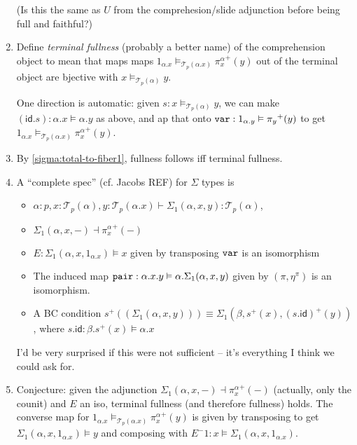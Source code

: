 \documentclass[10pt]{article}
\theoremstyle{definition}
\newcommand{\id}{\mathsf{id}}
\newcommand\TrPlus[2]{\ensuremath{{#1}^+(#2)}}
\newcommand\El[2]{\mathcal{T}_{#1}(#2)}
\begin{document}
\begin{enumerate}
  (Is this the same as $U$ from the comprehesion/slide adjunction before
  being full and faithful?)

\item \label{sigma:full-interesting} Define \emph{terminal fullness}
  (probably a better name) of the comprehension object to mean that maps
  maps $1_{\alpha.x} \vDash_{\El{p}{\alpha.x}} \TrPlus{\pi^\alpha_x}{y}$
  out of the terminal object are bjective with $x
  \vDash_{\El{p}{\alpha}} y$.

  One direction is automatic: given $s : x \vDash_{\El{p}{\alpha}} y$,
  we can make $(\id.s) : \alpha.x \vDash \alpha.y$ as above, and ap that
  onto $\mtt{var} : 1_{\alpha.y} \vDash \TrPlus{\pi_y}{y}$ to get
  $1_{\alpha.x} \vDash_{\El{p}{\alpha.x}} \TrPlus{\pi^\alpha_x}{y}$.

\item By \ref{sigma:total-to-fiber1}, fullness follows iff terminal
  fullness.  
  
\item \label{sigma:complete}

  A ``complete spec'' (cf. Jacobs REF) for $\Sigma$ types is
  \begin{itemize}
  \item $\alpha : p, x : \El{p}{\alpha}, y : \El{p}{\alpha.x} \vdash \Sigma_1(\alpha,x,y) : \El{p}{\alpha}$,
  \item $\Sigma_1(\alpha,x,-) \dashv \TrPlus{\pi^\alpha_x}{-}$
  \item $E : \Sigma_1(\alpha,x,1_{\alpha.x}) \vDash x$ given by
    transposing $\mathtt{var}$ is an isomorphism
  \item The induced map $\mathtt{pair} : \alpha.x.y \vDash
    \alpha.\Sigma_1(\alpha,x,y)$ given by $(\pi, \eta^\pi)$ is an
    isomorphism.
  \item A BC condition $\TrPlus{s}{(\Sigma_1(\alpha,x,y))} \equiv
    \Sigma_1(\beta,\TrPlus{s}{x}, \TrPlus{(s . \id)}{y})$,
    where $s.\id : \beta.\TrPlus{s}{x} \vDash \alpha.x$
  \end{itemize}
  I'd be very surprised if this were not sufficient -- it's everything I
  think we could ask for.

\item Conjecture: given the adjunction $\Sigma_1(\alpha,x,-) \dashv
  \TrPlus{\pi^\alpha_x}{-}$ (actually, only the counit) and $E$ an iso,
  terminal fullness (and therefore fullness) holds.  The converse map
  for $1_{\alpha.x} \vDash_{\El{p}{\alpha.x}} \TrPlus{\pi^\alpha_x}{y}$
  is given by transposing to get $\Sigma_1(\alpha,x,1_{\alpha.x}) \vDash
  y$ and composing with $E^-1 : x \vDash
  \Sigma_1(\alpha,x,1_{\alpha.x})$.


\end{enumerate}
\end{document}
